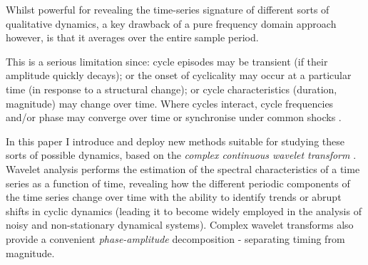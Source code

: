 \documentclass[11pt]{article}
\begin{document}
Whilst powerful for revealing the time-series signature of different sorts of qualitative dynamics, a key drawback of a pure frequency domain approach however, is that it averages over the entire sample period.

This is a serious limitation since: cycle episodes may be transient (if their amplitude quickly decays); or the onset of cyclicality may occur at a particular time (in response to a structural change); or cycle characteristics (duration, magnitude) may change over time. Where cycles interact, cycle frequencies and/or phase may converge over time or synchronise under common shocks \cite{Pikovsky2001}. %



In this paper I introduce and deploy new methods suitable for studying these sorts of possible dynamics, based on the \textit{complex continuous wavelet transform} \citep{Aguiar-Conraria2014}.
Wavelet analysis performs the estimation of the spectral characteristics of a time series as a function of time, revealing how the different periodic components of the time series change over time \citep{Aguiar-Conraria2014} with the ability to identify trends or abrupt shifts in cyclic dynamics (leading it to become widely employed in the analysis of noisy and non-stationary dynamical systems).  %
Complex wavelet transforms also provide a convenient \textit{phase-amplitude} decomposition - separating timing from magnitude.%
\end{document}

